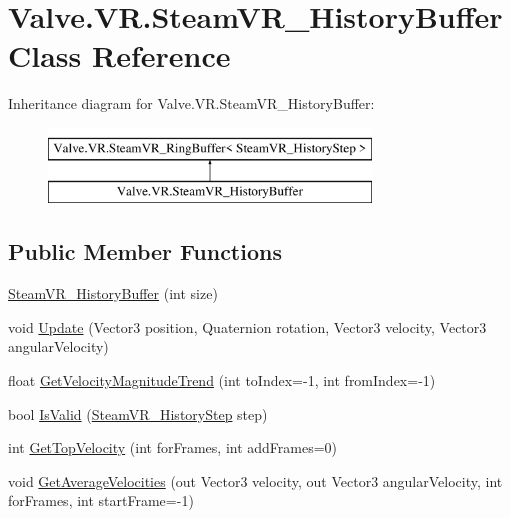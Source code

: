 \hypertarget{class_valve_1_1_v_r_1_1_steam_v_r___history_buffer}{}\section{Valve.\+V\+R.\+Steam\+V\+R\+\_\+\+History\+Buffer Class Reference}
\label{class_valve_1_1_v_r_1_1_steam_v_r___history_buffer}
Inheritance diagram for Valve.\+V\+R.\+Steam\+V\+R\+\_\+\+History\+Buffer\+:\begin{figure}[H]
\begin{center}
\leavevmode
\includegraphics[height=2.000000cm]{class_valve_1_1_v_r_1_1_steam_v_r___history_buffer}
\end{center}
\end{figure}
\subsection*{Public Member Functions}
\begin{DoxyCompactItemize}
\item 
\mbox{\hyperlink{class_valve_1_1_v_r_1_1_steam_v_r___history_buffer_af95a21a2a67c292071bf29b4b4f0f98d}{Steam\+V\+R\+\_\+\+History\+Buffer}} (int size)
\item 
void \mbox{\hyperlink{class_valve_1_1_v_r_1_1_steam_v_r___history_buffer_a7f39197b726b9b71ed14c0f065a08849}{Update}} (Vector3 position, Quaternion rotation, Vector3 velocity, Vector3 angular\+Velocity)
\item 
float \mbox{\hyperlink{class_valve_1_1_v_r_1_1_steam_v_r___history_buffer_a87dbc0840edd30d82bb5dc7e33b4b84c}{Get\+Velocity\+Magnitude\+Trend}} (int to\+Index=-\/1, int from\+Index=-\/1)
\item 
bool \mbox{\hyperlink{class_valve_1_1_v_r_1_1_steam_v_r___history_buffer_a63cc4137c712355bbd6b699f42bc51c0}{Is\+Valid}} (\mbox{\hyperlink{class_valve_1_1_v_r_1_1_steam_v_r___history_step}{Steam\+V\+R\+\_\+\+History\+Step}} step)
\item 
int \mbox{\hyperlink{class_valve_1_1_v_r_1_1_steam_v_r___history_buffer_a8bc2699617e344d5852d707bb36547f0}{Get\+Top\+Velocity}} (int for\+Frames, int add\+Frames=0)
\item 
void \mbox{\hyperlink{class_valve_1_1_v_r_1_1_steam_v_r___history_buffer_a385222a2e71f1c89dd60b91db78d80a7}{Get\+Average\+Velocities}} (out Vector3 velocity, out Vector3 angular\+Velocity, int for\+Frames, int start\+Frame=-\/1)
\end{DoxyCompactItemize}
